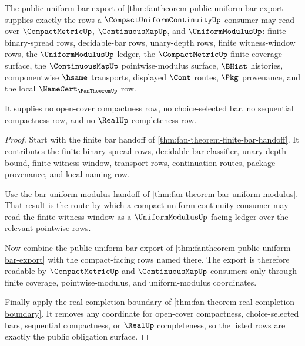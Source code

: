 \begin{theorem}
\label{thm:fan-theorem-compact-uniform-continuity-obligation-surface}
The public uniform bar export of \autoref{thm:fantheorem-public-uniform-bar-export} supplies exactly the rows a $\CompactUniformContinuityUp$ consumer may read over $\CompactMetricUp$, $\ContinuousMapUp$, and $\UniformModulusUp$: finite binary-spread rows, decidable-bar rows, unary-depth rows, finite witness-window rows, the $\UniformModulusUp$ ledger, the $\CompactMetricUp$ finite coverage surface, the $\ContinuousMapUp$ pointwise-modulus surface, $\BHist$ histories, componentwise $\hsame$ transports, displayed $\Cont$ routes, $\Pkg$ provenance, and the local $\NameCert_{\FanTheoremUp}$ row.

It supplies no open-cover compactness row, no choice-selected bar, no sequential compactness row, and no $\RealUp$ completeness row.
\end{theorem}
\begin{proof}
Start with the finite bar handoff of \autoref{thm:fan-theorem-finite-bar-handoff}. It contributes the finite binary-spread rows, decidable-bar classifier, unary-depth bound, finite witness window, transport rows, continuation routes, package provenance, and local naming row.

Use the bar uniform modulus handoff of \autoref{thm:fan-theorem-bar-uniform-modulus}. That result is the route by which a compact-uniform-continuity consumer may read the finite witness window as a $\UniformModulusUp$-facing ledger over the relevant pointwise rows.

Now combine the public uniform bar export of \autoref{thm:fantheorem-public-uniform-bar-export} with the compact-facing rows named there. The export is therefore readable by $\CompactMetricUp$ and $\ContinuousMapUp$ consumers only through finite coverage, pointwise-modulus, and uniform-modulus coordinates.

Finally apply the real completion boundary of \autoref{thm:fan-theorem-real-completion-boundary}. It removes any coordinate for open-cover compactness, choice-selected bars, sequential compactness, or $\RealUp$ completeness, so the listed rows are exactly the public obligation surface.
\end{proof}

